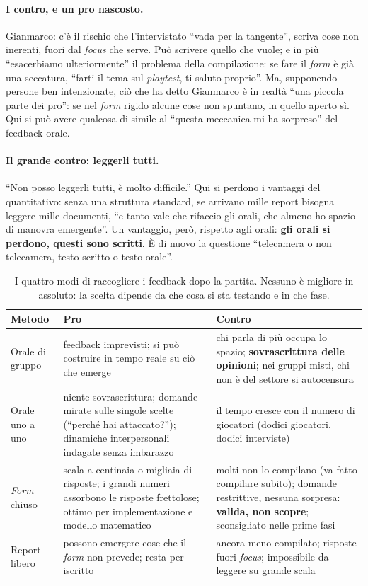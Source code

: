 \paragraph{I contro, e un pro nascosto.} Gianmarco: c'è il rischio che l'intervistato
``vada per la tangente'', scriva cose non inerenti, fuori dal \emph{focus} che serve.
Può scrivere quello che vuole; e in più ``esacerbiamo ulteriormente'' il problema della
compilazione: se fare il \emph{form} è già una seccatura, ``farti il tema sul
\emph{playtest}, ti saluto proprio''. Ma, supponendo persone ben intenzionate, ciò che ha
detto Gianmarco è in realtà ``una piccola parte dei pro'': se nel \emph{form} rigido
alcune cose non spuntano, in quello aperto sì. Qui si può avere qualcosa di simile al
``questa meccanica mi ha sorpreso'' del feedback orale.

\paragraph{Il grande contro: leggerli tutti.} ``Non posso leggerli tutti, è molto
difficile.'' Qui si perdono i vantaggi del quantitativo: senza una struttura standard, se
arrivano mille report bisogna leggere mille documenti, ``e tanto vale che rifaccio gli
orali, che almeno ho spazio di manovra emergente''. Un vantaggio, però, rispetto agli
orali: \textbf{gli orali si perdono, questi sono scritti}. È di nuovo la questione
``telecamera o non telecamera, testo scritto o testo orale''.

\begin{table}[htbp]
\centering
\small
\begin{tabular}{@{}p{2.6cm}p{5.0cm}p{5.4cm}@{}}
\toprule
\textbf{Metodo} & \textbf{Pro} & \textbf{Contro} \\
\midrule
Orale di gruppo & feedback imprevisti; si può costruire in tempo reale su
ciò che emerge & chi parla di più occupa lo spazio; \textbf{sovrascrittura delle
opinioni}; nei gruppi misti, chi non è del settore si autocensura \\
\addlinespace
Orale uno a uno & niente sovrascrittura; domande mirate sulle singole scelte
(``perché hai attaccato?''); dinamiche interpersonali indagate senza imbarazzo & il tempo
cresce con il numero di giocatori (dodici giocatori, dodici interviste) \\
\addlinespace
\emph{Form} chiuso & scala a centinaia o migliaia di risposte; i grandi numeri
assorbono le risposte frettolose; ottimo per implementazione e modello matematico &
molti non lo compilano (va fatto compilare subito); domande restrittive, nessuna
sorpresa: \textbf{valida, non scopre}; sconsigliato nelle prime fasi \\
\addlinespace
Report libero & possono emergere cose che il \emph{form} non prevede; resta per iscritto
& ancora meno compilato; risposte fuori \emph{focus}; impossibile da leggere su grande
scala \\
\bottomrule
\end{tabular}
\caption{I quattro modi di raccogliere i feedback dopo la partita. Nessuno è migliore
in assoluto: la scelta dipende da che cosa si sta testando e in che fase.}
\label{a12:tab:dopo}
\end{table}

